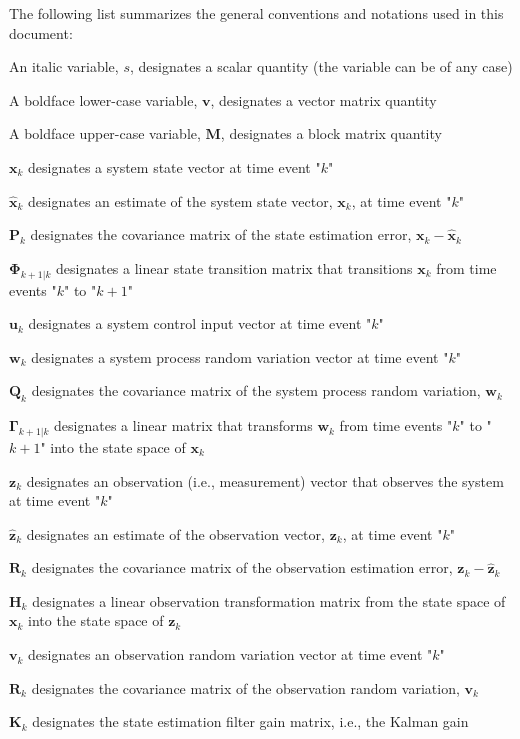 The following list summarizes the general conventions and notations used in this document:

\begin{myitemize}
    \item An italic variable, $s$, designates a scalar quantity (the variable can be of any case)
    \item A boldface lower-case variable, $\mathbf{v}$, designates a vector matrix quantity
    \item A boldface upper-case variable, $\mathbf{M}$, designates a block matrix quantity
    \item $\mathbf{x}_k$ designates a system state vector at time event "$k$"
    \item $\hat{\mathbf{x}}_k$ designates an estimate of the system state vector, $\mathbf{x}_k$, at time event "$k$"
    \item $\mathbf{P}_k$ designates the covariance matrix of the state estimation error, $\mathbf{x}_k - \hat{\mathbf{x}}_k$
    \item $\mathbf{\Phi}_{k+1|k}$ designates a linear state transition matrix that transitions $\mathbf{x}_k$ from time events "$k$" to "$k+1$"
    \item $\mathbf{u}_k$ designates a system control input vector at time event "$k$"
    \item $\mathbf{w}_k$ designates a system process random variation vector at time event "$k$"
    \item $\mathbf{Q}_k$ designates the covariance matrix of the system process random variation, $\mathbf{w}_k$
    \item $\mathbf{\Gamma}_{k+1|k}$ designates a linear matrix that transforms $\mathbf{w}_k$ from time events "$k$" to "$k+1$" into the state space of $\mathbf{x}_k$
    \item $\mathbf{z}_k$ designates an observation (i.e., measurement) vector that observes the system at time event "$k$"
    \item $\hat{\mathbf{z}}_k$ designates an estimate of the observation vector, $\mathbf{z}_k$, at time event "$k$"
    \item $\mathbf{R}_k$ designates the covariance matrix of the observation estimation error, $\mathbf{z}_k - \hat{\mathbf{z}}_k$
    \item $\mathbf{H}_k$ designates a linear observation transformation matrix from the state space of $\mathbf{x}_k$ into the state space of $\mathbf{z}_k$
    \item $\mathbf{v}_k$ designates an observation random variation vector at time event "$k$"
    \item $\mathbf{R}_k$ designates the covariance matrix of the observation random variation, $\mathbf{v}_k$
    \item $\mathbf{K}_k$ designates the state estimation filter gain matrix, i.e., the Kalman gain
\end{myitemize}
